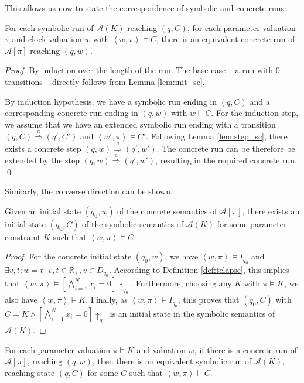 \documentclass{llncs}
\newcommand{\A}{\ensuremath{\mathcal{A}}}
\newcommand{\Reals}{\ensuremath{\mathbb{R}}}
\newcommand{\Trans}[1]{\ensuremath{\overset{#1}{\Rightarrow}}}
\newcommand{\telapse}{\ensuremath{\uparrow}}
\begin{document}
This allows us now to state the correspondence of symbolic and
concrete runs:
\begin{proposition}\label{prop:run_sc}
  For each symbolic run of $\A(K)$ reaching $(q,C)$, for each
  parameter valuation $\pi$ and clock valuation $w$ with $\left< w,
    \pi \right> \models C$, there is an equivalent concrete run of
  $\A[\pi]$ reaching $(q,w)$.
\end{proposition}

\begin{proof}
  By induction over the length of the run. The base case -- a run with
  0 transitions -- directly follows from Lemma \ref{lem:init_sc}.

  By induction hypothesis, we have a symbolic run ending in $(q,C)$
  and a corresponding concrete run ending in $(q,w)$ with $w \models
  C$. For the induction step, we assume that we have an extended
  symbolic run ending with a transition $(q, C) \Trans{a} (q', C')$
  and $\left<w', \pi\right> \models C'$. Following Lemma
  \ref{lem:step_sc}, there exists a concrete step $(q, w) \Trans{a}
  (q', w')$. The concrete run can be therefore be extended by the step
  $(q,w) \Trans{a} (q',w')$, resulting in the required concrete run.
  \qed
\end{proof}

Similarly, the converse direction can be shown. 

\begin{lemma}\label{lem:init_cs}
  Given an initial state $(q_0,w)$ of the concrete semantics of
  $\A[\pi]$, there exists an initial state $(q_0,C)$ of the
  symbolic semantics of $\A(K)$ for some parameter constraint
  $K$ such that $\left<w, \pi\right> \models C$.
\end{lemma}

\begin{proof}
  For the concrete initial state $(q_0, w)$, we have
  $\left<w,\pi\right> \models I_{q_0}$ and $\exists v, t:
  w = t \cdot v, t \in \Reals_+, v \in D_{q_0}$. According to Definition
  \ref{def:telapse}, this implies that $\left<w, \pi\right>
  \models [\bigwedge_{i=1}^N x_i=0] \telapse_{q_0}$. Furthermore, choosing any $K$ with
  $\pi \models K$, we also have $\left<w, \pi\right> \models
  K$. Finally, as $\left<w, \pi\right> \models I_{q_0}$, this proves
  that $(q_0, C)$ with $C = K \wedge [\bigwedge_{i=1}^N x_i=0]\telapse_{q_0}$ is an
  initial state in the symbolic semantics of $\A(K)$.
\end{proof}

\begin{proposition}\label{prop:run_cs}
  For each parameter valuation $\pi \models K$ and valuation
  $w$, if there is a concrete run of $\A[\pi]$, reaching $(q,
  w)$, then there is an equivalent symbolic run of
  $\A(K)$, reaching state $(q, C)$ for some $C$ such that $\left<w, \pi\right>
  \models C$.
\end{proposition}
\end{document}
